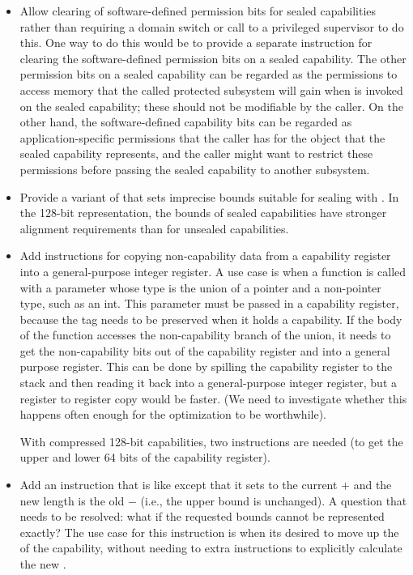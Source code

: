 \begin{itemize}
\item
  Allow clearing of software-defined permission bits for sealed
  capabilities rather than requiring a domain switch or call to a privileged
  supervisor to do this.
  One way to do this would be to provide a separate instruction for clearing
  the software-defined permission bits
  on a sealed capability. The other permission bits on a sealed capability
  can be regarded as the permissions to access memory that the called protected
  subsystem will gain when  is invoked on the sealed
  capability; these should not be modifiable by the caller. On the other hand,
  the software-defined capability bits can be regarded as application-specific
  permissions that the caller has for the object that the sealed capability
  represents, and the caller might want to restrict these permissions before
  passing the sealed capability to another subsystem.

\item
  Provide a variant of  that sets imprecise bounds
  suitable for sealing with . In the 128-bit
  representation, the bounds of sealed capabilities have stronger alignment
  requirements than for unsealed capabilities.

\item
  Add instructions for copying non-capability data from a capability register
  into a general-purpose integer register. A use case is when a function is called
  with a parameter whose type is the union of a pointer and a non-pointer type,
  such as an int. This parameter must be passed in a capability register, because
  the tag needs to be preserved when it holds a capability. If the body of
  the function accesses the non-capability branch of the union, it needs to
  get the non-capability bits out of the capability register and into a general
  purpose register. This can be done by spilling the capability register to the
  stack and then reading it back into a general-purpose integer register, but a register
  to register copy would be faster. (We need to investigate whether this happens
  often enough for the optimization to be worthwhile).

  With compressed 128-bit capabilities, two instructions are needed (to get
  the upper and lower 64 bits of the capability register).

\item
  Add an instruction that is like  except that it
  sets \cbase{} to the current \cbase{} $+$ \coffset{} and the new length
  is the old \clength{} $-$ \coffset{} (i.e., the upper bound is unchanged).
  A question that needs to be resolved: what if the requested bounds cannot
  be represented exactly? The use case for this instruction is when its
  desired to move up the \cbase{} of the capability, without needing to
  extra instructions to explicitly calculate the new \clength{}.
\end{itemize}

